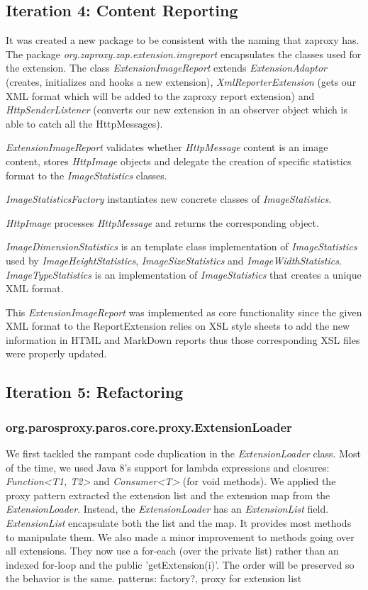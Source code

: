 \subsection{Iteration 4: Content Reporting}
It was created a new package to be consistent with the naming that zaproxy has. The package \textit{org.zaproxy.zap.extension.imgreport} encapsulates the classes used for the extension. The class \textit{ExtensionImageReport} extends \textit{ExtensionAdaptor} (creates, initializes and hooks a new extension), \textit{XmlReporterExtension} (gets our XML format which will be added to the zaproxy report extension) and \textit{HttpSenderListener} (converts our new extension in an observer object which is able to catch all the HttpMessages).
\par
\textit{ExtensionImageReport} validates whether \textit{HttpMessage} content is an image content, stores \textit{HttpImage} objects and delegate the creation of specific statistics format to the \textit{ImageStatistics} classes. 
\par
\textit{ImageStatisticsFactory} instantiates new concrete classes of \textit{ImageStatistics}.
\par
\textit{HttpImage} processes \textit{HttpMessage} and returns the corresponding object.
\par
\textit{ImageDimensionStatistics} is an template class implementation of \textit{ImageStatistics} used by \textit{ImageHeightStatistics}, \textit{ImageSizeStatistics} and \textit{ImageWidthStatistics}. \textit{ImageTypeStatistics} is an implementation of \textit{ImageStatistics} that creates a unique XML format.
\par
This \textit{ExtensionImageReport} was implemented as core functionality since the given XML format to the ReportExtension relies on XSL style sheets to add the new information in HTML and MarkDown reports thus those corresponding XSL files were properly updated.

\subsection{Iteration 5: Refactoring}
\subsubsection{org.parosproxy.paros.core.proxy.ExtensionLoader}
We first tackled the rampant code duplication in  the \textit{ExtensionLoader} class. Most of the time, we used Java 8's support for lambda expressions and closures: \textit{Function<T1, T2>} and \textit{Consumer<T>} (for void methods).
We applied the proxy pattern extracted the extension list and the extension map from the \textit{ExtensionLoader}. Instead, the \textit{ExtensionLoader} has an \textit{ExtensionList} field. \textit{ExtensionList} encapsulate both the list and the map. It provides most methods to manipulate them.
We also made a minor improvement to methods going over all extensions. They now use a for-each (over the private list) rather than an indexed for-loop and the public 'getExtension(i)'. The order will be preserved so the behavior is the same.
patterns: factory?, proxy for extension list
